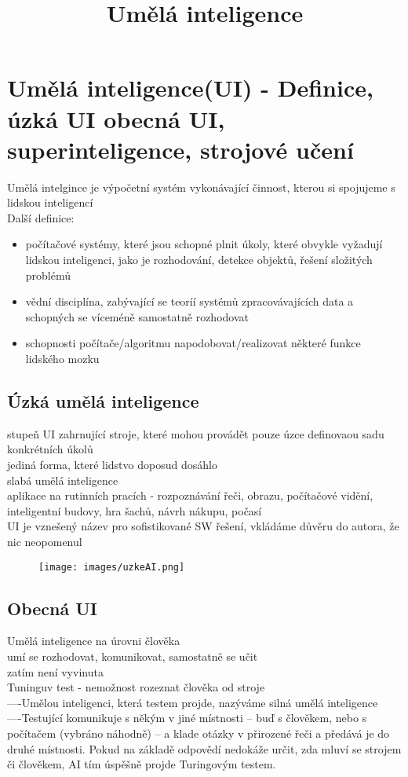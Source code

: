 \title{Umělá inteligence}

\section{Umělá inteligence(UI) - Definice, úzká UI obecná UI, superinteligence, strojové učení}
Umělá intelgince je výpočetní systém vykonávající činnost, kterou si spojujeme s lidskou inteligencí\\
Další definice:
\begin{itemize}
    \item počítačové systémy, které jsou schopné plnit úkoly, které obvykle vyžadují lidskou inteligenci, jako je rozhodování, detekce objektů, řešení složitých problémů
    \item vědní disciplína, zabývající se teoríí systémů zpracovávajících data a schopných se víceméně samostatně rozhodovat
    \item schopnosti počítače/algoritmu napodobovat/realizovat některé funkce lidského mozku
\end{itemize}
\subsection{Úzká umělá inteligence}
stupeň UI zahrnující stroje, které mohou provádět pouze úzce definovaou sadu konkrétních úkolů\\
jediná forma, které lidstvo doposud dosáhlo\\
slabá umělá inteligence\\
aplikace na rutinních pracích - rozpoznávání řeči, obrazu, počítačové vidění, inteligentní budovy, hra šachů, návrh nákupu, počasí\\
UI je vznešený název pro sofistikované SW řešení, vkládáme důvěru do autora, že nic neopomenul\\
\begin{figure}[H]
    \texttt{[image: images/uzkeAI.png]}
\end{figure}
\subsection{Obecná UI}
Umělá inteligence na úrovni člověka\\
umí se rozhodovat, komunikovat, samostatně se učit\\
zatím není vyvinuta\\
Tuninguv test - nemožnost rozeznat člověka od stroje\\
----Umělou inteligenci, která testem projde, nazýváme silná umělá inteligence\\
----Testující komunikuje s někým v jiné místnosti – buď s člověkem, nebo s počítačem (vybráno náhodně) – a klade otázky v přirozené řeči a předává je do druhé místnosti. Pokud na základě odpovědí nedokáže určit, zda mluví se strojem či člověkem, AI tím úspěšně projde Turingovým testem.\\
